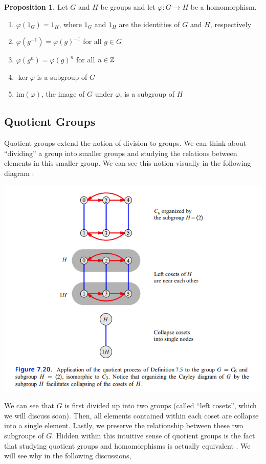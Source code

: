 \documentclass[11pt, reqno]{amsart}
\theoremstyle{plain}
\theoremstyle{definition}
\theoremstyle{example}
\begin{document}
\textbf{Proposition 1.} Let $G$ and $H$ be groups and let $\varphi: G \to H$ be a homomorphism.
\begin{enumerate}
\item $\varphi(1_G) = 1_H$, where $1_G$ and $1_H$ are the identities of $G$ and $H$, respectively
\item $\varphi(g^{-1}) = \varphi(g)^{-1}$ for all $g \in G$
\item $\varphi(g^n) = \varphi(g)^n$ for all $n \in \mathbb{Z}$
\item $\ker \varphi$ is a subgroup of $G$
\item $\text{im}(\varphi)$, the image of $G$ under $\varphi$, is a subgroup of $H$
\end{enumerate}

\newpage
\subsection{Quotient Groups}

\par
Quotient groups extend the notion of division to groups. We can think about ``dividing'' a group into smaller groups and studying the relations between elements in this smaller group. We can see this notion visually in the following diagram \cite[\S 7.3, p. 133]{carter}:

\includegraphics[scale=1]{quotient}

\par
We can see that $G$ is first divided up into two groups (called ``left cosets'', which we will discuss soon). Then, all elements contained within each coset are collapse into a single element. Lastly, we preserve the relationship between these two subgroups of $G$. Hidden within this intuitive sense of quotient groups is the fact that studying quotient groups and homomorphisms is actually equivalent \cite{dummit, quotientwiki}. We will see why in the following discussions,
\end{document}
